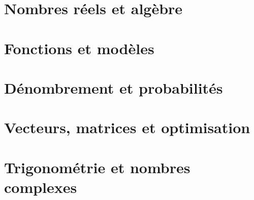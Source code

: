 


\part{Nombres réels et algèbre}


\part{Fonctions et modèles}




\part{Dénombrement et probabilités}


\part{Vecteurs, matrices et optimisation}





\part{Trigonométrie et nombres complexes}




\appendix



